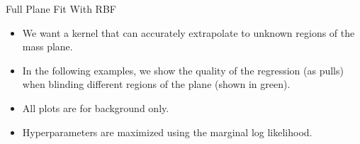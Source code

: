 \documentclass[10pt]{beamer}
\begin{document}
\begin{frame}{Full Plane Fit With RBF}
  \begin{itemize}
  \item We want a kernel that can accurately extrapolate to unknown regions of the mass plane.
  \item In the following examples, we show the quality of the regression (as pulls) when blinding different regions of the plane (shown in green).
  \item All plots are for background only. 
  \item Hyperparameters are maximized using the marginal log likelihood.
  \end{itemize}
\end{frame}


\newcommand{\makegrid}[6]{
  \begin{center}
    \blockcite[(0,1em)]{#1}{$m_{\stopq}=1200\,,\,m_{\chi}=600$}
    \blockcite[(0,1em)]{#2}{$m_{\stopq}=1500\,,\,m_{\chi}=750$}
    \blockcite[(0,1em)]{#3}{$m_{\stopq}=1500\,,\,m_{\chi}=750$}
  \end{center}
  \begin{center}
    \blockcite[(0,1em)]{#4}{$m_{\stopq}=1500\,,\,m_{\chi}=750$}
    \blockcite[(0,1em)]{#5}{$m_{\stopq}=2000\,,\,m_{\chi}=1400$}
    \blockcite[(0,1em)]{#6}{$m_{\stopq}=2000\,,\,m_{\chi}=1000$}
  \end{center}

}
\end{document}
